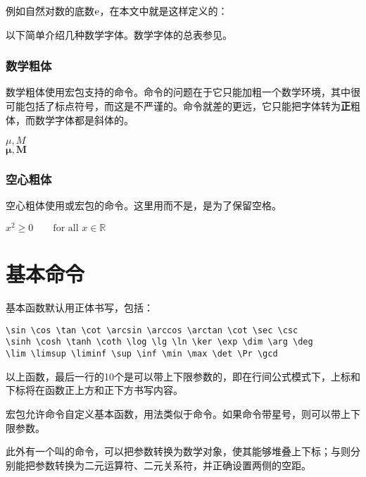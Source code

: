 例如自然对数的底数$\ue$，在本文中就是这样定义的：
\begin{latex}
\newcommand{\ue}{\mathrm{e}}
\end{latex}

以下简单介绍几种数学字体。数学字体的总表参见。

\subsubsection{数学粗体}
数学粗体使用宏包支持的命令。命令的问题在于它只能加粗一个数学环境，其中很可能包括了标点符号，而这是不严谨的。命令就差的更远，它只能把字体转为\textbf{正}粗体，而数学字体都是斜体的。

\begin{codeshow}
$\mu,M$\\ $\boldsymbol{\mu},
\boldsymbol{M}$
\end{codeshow}

\subsubsection{空心粗体}
空心粗体使用或宏包的命令。这里用而不是，是为了保留空格。

\begin{codeshow}
$x^2 \geq 0 \qquad
\textrm{for all }x\in\mathbb{R}$
\end{codeshow}

\section{基本命令}
基本函数默认用正体书写，包括：
\begin{verbatim}
\sin \cos \tan \cot \arcsin \arccos \arctan \cot \sec \csc
\sinh \cosh \tanh \coth \log \lg \ln \ker \exp \dim \arg \deg 
\lim \limsup \liminf \sup \inf \min \max \det \Pr \gcd
\end{verbatim}

以上函数，最后一行的10个是可以带上下限参数的，即在行间公式模式下，上标和下标将在函数正上方和正下方书写内容。

宏包允许命令自定义基本函数，用法类似于命令。如果命令带星号，则可以带上下限参数。

此外有一个叫的命令，可以把参数转换为数学对象，使其能够堆叠上下标；与则分别能把参数转换为二元运算符、二元关系符，并正确设置两侧的空距。

